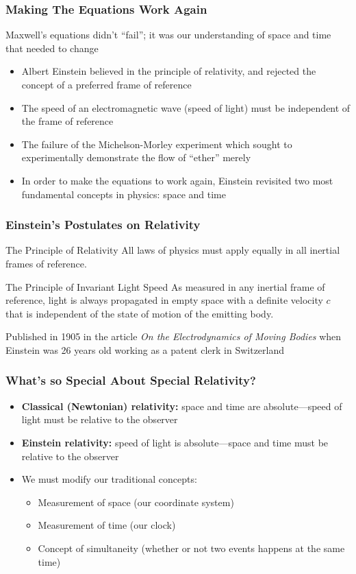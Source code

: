 \documentclass[12pt,compress,aspectratio=169]{beamer}
\begin{document}
\begin{frame}
  \frametitle{Making The Equations Work Again}
  Maxwell's equations didn't ``fail''; it was our understanding of space and
  time that needed to change
  \begin{itemize}
  \item Albert Einstein believed in the principle of relativity, and rejected
    the concept of a preferred frame of reference
  \item The speed of an electromagnetic wave (speed of light) must be
    independent of the frame of reference
  \item The failure of the Michelson-Morley experiment which sought to
    experimentally demonstrate the flow of ``ether'' merely
  \item In order to make the equations to work again, Einstein revisited two
    most fundamental concepts in physics: space and time
  \end{itemize}
\end{frame}


\begin{frame}
  \frametitle{Einstein's Postulates on Relativity}
  \begin{block}{The Principle of Relativity}
    All laws of physics must apply equally in all inertial frames of reference.
  \end{block}

  \begin{block}{The Principle of Invariant Light Speed}
    As measured in any inertial frame of reference, light is always propagated
    in empty space with a definite velocity $c$ that is independent of the
    state of motion of the emitting body.
  \end{block}
  
  \vspace{.15in}Published in 1905 in the article
  \emph{On the Electrodynamics of Moving Bodies} when Einstein was 26 years old
  working as a patent clerk in Switzerland
\end{frame}


\begin{frame}
  \frametitle{What's so Special About Special Relativity?}
  \begin{itemize}
  \item\textbf{Classical (Newtonian) relativity:} space and time are
    absolute---speed of light must be relative to the observer
  \item\textbf{Einstein relativity:} speed of light is absolute---space and
    time must be relative to the observer
  \item We must modify our traditional concepts:
    \begin{itemize}
    \item Measurement of space (our coordinate system)
    \item Measurement of time (our clock)
    \item Concept of simultaneity (whether or not two events happens at the
      same time)
    \end{itemize}
  \end{itemize}
\end{frame}
\end{document}
